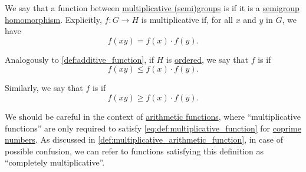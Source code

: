 \begin{definition}\label{def:multiplicative_function}\mimprovised
  We say that a function between \hyperref[con:additive_semigroup]{multiplicative (semi)groups} is  if it is a \hyperref[def:semigroup/homomorphism]{semigroup homomorphism}. Explicitly, \( f: G \to H \) is multiplicative if, for all \( x \) and \( y \) in \( G \), we have
  \begin{equation}\label{eq:def:multiplicative_function}
    f(xy) = f(x) \cdot f(y).
  \end{equation}

  \begin{thmenum}
     Analogously to \cref{def:additive_function}, if \( H \) is \hyperref[def:ordered_semigroup]{ordered}, we say that \( f \) is  if
    \begin{equation}\label{eq:def:multiplicative_function/sub}
      f(xy) \leq f(x) \cdot f(y).
    \end{equation}

     Similarly, we say that \( f \) is  if
    \begin{equation}\label{eq:def:multiplicative_function/super}
      f(xy) \geq f(x) \cdot f(y).
    \end{equation}
  \end{thmenum}
\end{definition}
\begin{comments}
  \item We should be careful in the context of \hyperref[def:arithmetic_function]{arithmetic functions}, where \enquote{multiplicative functions} are only required to satisfy \eqref{eq:def:multiplicative_function} for \hyperref[def:coprime_numbers]{coprime numbers}. As discussed in \cref{def:multiplicative_arithmetic_function}, in case of possible confusion, we can refer to functions satisfying this definition as \enquote{completely multiplicative}.
\end{comments}

